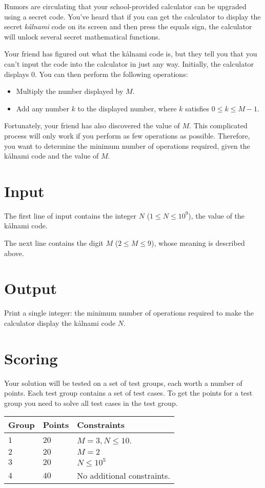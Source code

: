 
Rumors are circulating that your school-provided calculator can be upgraded using a secret code.  
You've heard that if you can get the calculator to display the secret \textit{kålnami}
code on its screen and then press the equals sign, the calculator will unlock several
secret mathematical functions.  

Your friend has figured out what the kålnami code is, but they tell you that
you can't input the code into the calculator in just any way.  
Initially, the calculator displays $0$. You can then perform the following operations:  
\begin{itemize}  
  \item Multiply the number displayed by $M$.  
  \item Add any number $k$ to the displayed number, where $k$ satisfies $0 \leq k \leq M-1$.  
\end{itemize}  

Fortunately, your friend has also discovered the value of $M$.  
This complicated process will only work if you perform as few operations as possible.
Therefore, you want to determine the minimum number of operations required, given the kålnami
code and the value of $M$.  

\section*{Input}  
The first line of input contains the integer $N$ ($1 \leq N \leq 10^9$), the value of the kålnami code.

The next line contains the digit $M$ ($2 \leq M \leq 9$), whose meaning is described above.

\section*{Output}  
Print a single integer: the minimum number of operations required to make the calculator display the kålnami code $N$.

\section*{Scoring}
Your solution will be tested on a set of test groups, each worth a number of points. Each test group contains
a set of test cases. To get the points for a test group you need to solve all test cases in the test group.

\noindent
\begin{tabular}{| l | l | p{12cm} |}
  \hline
  \textbf{Group} & \textbf{Points} & \textbf{Constraints} \\ \hline
  $1$    & $20$       & $M=3, N \leq 10$. \\ \hline
  $2$    & $20$       & $M=2$ \\ \hline
  $3$    & $20$       & $N \leq 10^5$ \\ \hline
  $4$    & $40$       & No additional constraints. \\ \hline
\end{tabular}

